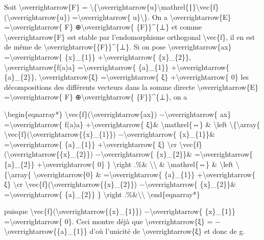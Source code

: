 \documentclass[]{article}
\begin{document}
Soit \textbackslash{}overrightarrow\{F\} =
\textbackslash{}\{\textbackslash{}overrightarrow\{u\}\textbackslash{}mathrel\{∣\}\textbackslash{}vec\{f\}(\textbackslash{}overrightarrow\{u\})
=\textbackslash{}overrightarrow\{ u\}\textbackslash{}\}. On a
\textbackslash{}overrightarrow\{E\} =\textbackslash{}overrightarrow\{
F\} ⊕\textbackslash{}overrightarrow\{ \{F\}\}\^{}\{⊥\} et comme
\textbackslash{}overrightarrow\{F\} est stable par l'endomorphisme
orthogonal \textbackslash{}vec\{f\}, il en est de même de
\textbackslash{}overrightarrow\{\{F\}\}\^{}\{⊥\}. Si on pose
\textbackslash{}overrightarrow\{ax\} =\textbackslash{}overrightarrow\{
\{x\}\_\{1\}\} +\textbackslash{}overrightarrow\{ \{x\}\_\{2\}\},
\textbackslash{}overrightarrow\{f(a)a\}
=\textbackslash{}overrightarrow\{ \{a\}\_\{1\}\}
+\textbackslash{}overrightarrow\{ \{a\}\_\{2\}\},
\textbackslash{}overrightarrow\{ξ\} =\textbackslash{}overrightarrow\{
ξ\} +\textbackslash{}overrightarrow\{ 0\} les décompositions des
différents vecteurs dans la somme directe
\textbackslash{}overrightarrow\{E\} =\textbackslash{}overrightarrow\{
F\} ⊕\textbackslash{}overrightarrow\{ \{F\}\}\^{}\{⊥\}, on a

\textbackslash{}begin\{eqnarray*\}
\textbackslash{}vec\{f\}(\textbackslash{}overrightarrow\{ax\})
−\textbackslash{}overrightarrow\{ ax\} =\textbackslash{}overrightarrow\{
f(a)a\} +\textbackslash{}overrightarrow\{ ξ\}\&
\textbackslash{}mathrel\{⇔\} \& \textbackslash{}left
\textbackslash{}\{\textbackslash{}array\{
\textbackslash{}vec\{f\}(\textbackslash{}overrightarrow\{\{x\}\_\{1\}\})
−\textbackslash{}overrightarrow\{ \{x\}\_\{1\}\}\&
=\textbackslash{}overrightarrow\{ \{a\}\_\{1\}\}
+\textbackslash{}overrightarrow\{ ξ\} \textbackslash{}cr
\textbackslash{}vec\{f\}(\textbackslash{}overrightarrow\{\{x\}\_\{2\}\})
−\textbackslash{}overrightarrow\{ \{x\}\_\{2\}\}\&
=\textbackslash{}overrightarrow\{ \{a\}\_\{2\}\}
+\textbackslash{}overrightarrow\{ 0\} \} \textbackslash{}right .\%\&
\textbackslash{}\textbackslash{} \& \textbackslash{}mathrel\{⇔\} \&
\textbackslash{}left \textbackslash{}\{\textbackslash{}array\{
\textbackslash{}overrightarrow\{0\} \& =\textbackslash{}overrightarrow\{
\{a\}\_\{1\}\} +\textbackslash{}overrightarrow\{ ξ\} \textbackslash{}cr
\textbackslash{}vec\{f\}(\textbackslash{}overrightarrow\{\{x\}\_\{2\}\})
−\textbackslash{}overrightarrow\{ \{x\}\_\{2\}\}\&
=\textbackslash{}overrightarrow\{ \{a\}\_\{2\}\} \}
\textbackslash{}right .\%\&\textbackslash{}\textbackslash{}
\textbackslash{}end\{eqnarray*\}

puisque
\textbackslash{}vec\{f\}(\textbackslash{}overrightarrow\{\{x\}\_\{1\}\})
−\textbackslash{}overrightarrow\{ \{x\}\_\{1\}\}
=\textbackslash{}overrightarrow\{ 0\}. Ceci montre déjà que
\textbackslash{}overrightarrow\{ξ\} =
−\textbackslash{}overrightarrow\{\{a\}\_\{1\}\} d'où l'unicité de
\textbackslash{}overrightarrow\{ξ\} et donc de g.
\end{document}
